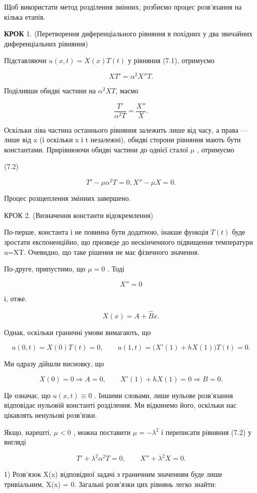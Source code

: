 Щоб використати метод розділення змінних, розбиємо процес розв'язання на кілька етапів.

\textbf{КРОК} 1. (Перетворення диференціального рівняння в похідних у два звичайних диференціальних рівняння)

Підставляючи \(u(x,t)=X(x)T(t)\) у рівняння (7.1), отримуємо

\[
XT'=\alpha^2X''T.
\]

Поділивши обидві частини на \(\alpha^2XT\), маємо

\[
\frac{T'}{\alpha^2 T} = \frac{X''}{X} .
\]

Оскільки ліва частина останнього рівняння залежить лише від часу, а права --- лише від x (і оскільки x і t незалежні), обидві сторони рівняння мають бути константами. Прирівнюючи обидві частини до однієї сталої \(\mu\) , отримуємо

(7.2)

\[
T' - \mu \alpha^{2} T = 0, X'' - \mu X = 0.
\]

Процес розщеплення змінних завершено.

КРОК 2. (Визначення константи відокремлення)

По-перше, константа і не повинна бути додатною, інакше функція \(T\left( t\right)\) буде зростати експоненційно, що призведе до нескінченного підвищення температури u=XT. Очевидно, що таке рішення не має фізичного значення.

По-друге, припустимо, що \(\mu = 0\) . Тоді

\[
X'' = 0
\]

і, отже.

\[
X(x) = A + \hat{B}x.
\]

Однак, оскільки граничні умови вимагають, що

\[
u(0, t) = X(0) T(t) = 0, \qquad u(1,t)=\bigl(X'(1)+hX(1)\bigr)T(t)=0.
\]

Ми одразу дійшли висновку, що

\[
X(0)=0\Rightarrow A=0,\qquad X'(1)+hX(1)=0\Rightarrow B=0.
\]

Це означає, що \(u(x, t) \equiv 0\) . Іншими словами, лише нульове розв'язання відповідає нульовій константі розділення. Ми відкинемо його, оскільки нас цікавлять ненульові розв'язки.

Якщо, нарешті, \(\mu < 0\) , можна поставити \(\mu = -\lambda^2\) і переписати рівняння (7.2) у вигляді

\[
T' + \lambda^2 \alpha^2 T = 0, \qquad X'' + \lambda^2 X = 0.
\]

1) Розв'язок X(x) відповідної задачі з граничним значенням буде лише тривіальним, X(x) = 0. Загальні розв'язки цих рівнянь легко знайти:

